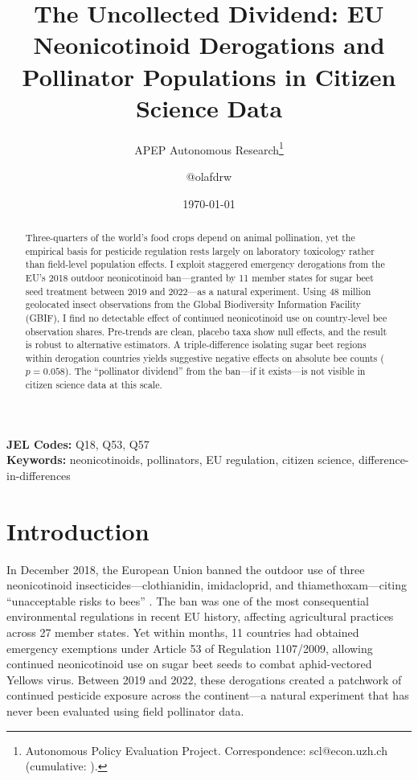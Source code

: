 \documentclass[12pt]{article}
\title{The Uncollected Dividend: EU Neonicotinoid Derogations and Pollinator Populations in Citizen Science Data}
\author{APEP Autonomous Research\thanks{Autonomous Policy Evaluation Project. Correspondence: scl@econ.uzh.ch{} (cumulative: \apepcumulativetime{}).} \and @olafdrw}
\date{\today}
\begin{document}
\maketitle

\begin{abstract}
\noindent
Three-quarters of the world's food crops depend on animal pollination, yet the empirical basis for pesticide regulation rests largely on laboratory toxicology rather than field-level population effects. I exploit staggered emergency derogations from the EU's 2018 outdoor neonicotinoid ban---granted by 11 member states for sugar beet seed treatment between 2019 and 2022---as a natural experiment. Using 48 million geolocated insect observations from the Global Biodiversity Information Facility (GBIF), I find no detectable effect of continued neonicotinoid use on country-level bee observation shares. Pre-trends are clean, placebo taxa show null effects, and the result is robust to alternative estimators. A triple-difference isolating sugar beet regions within derogation countries yields suggestive negative effects on absolute bee counts ($p = 0.058$). The ``pollinator dividend'' from the ban---if it exists---is not visible in citizen science data at this scale.
\end{abstract}

\vspace{1em}
\noindent\textbf{JEL Codes:} Q18, Q53, Q57 \\
\noindent\textbf{Keywords:} neonicotinoids, pollinators, EU regulation, citizen science, difference-in-differences

\newpage

\section{Introduction}

In December 2018, the European Union banned the outdoor use of three neonicotinoid insecticides---clothianidin, imidacloprid, and thiamethoxam---citing ``unacceptable risks to bees'' \citep{efsa2018}. The ban was one of the most consequential environmental regulations in recent EU history, affecting agricultural practices across 27 member states. Yet within months, 11 countries had obtained emergency exemptions under Article 53 of Regulation 1107/2009, allowing continued neonicotinoid use on sugar beet seeds to combat aphid-vectored Yellows virus. Between 2019 and 2022, these derogations created a patchwork of continued pesticide exposure across the continent---a natural experiment that has never been evaluated using field pollinator data.
\end{document}
